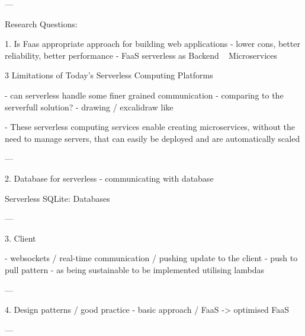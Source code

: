 ---

Research Questions:

1. Is Faas appropriate approach for building web applications - lower cons, better reliability, better performance
- FaaS serverless as Backend ~ Microservices

\cite{BerkeleyServerless}
3 Limitations of Today’s Serverless Computing Platforms

- can serverless handle some finer grained communication - comparing to the serverfull solution? - drawing / excalidraw like

\cite{LeveragingServerlessCloudComputingArchitectures}
- These serverless computing services enable creating microservices, without the need to manage servers, that can easily be deployed and are automatically scaled

---

2. Database for serverless - communicating with database

\cite{BerkeleyServerless}
Serverless SQLite: Databases

---

3. Client

- websockets / real-time communication / pushing update to the client - push to pull pattern - as being sustainable to be implemented utilising lambdas

---

4. Design patterns / good practice
- basic approach / FaaS -> optimised FaaS

---

